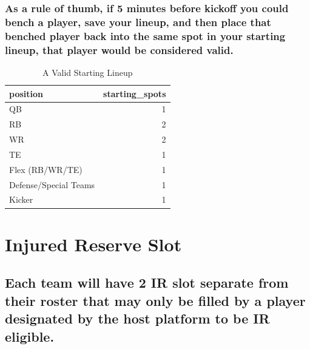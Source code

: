\documentclass[
]{book}
\begin{document}
\hypertarget{as-a-rule-of-thumb-if-5-minutes-before-kickoff-you-could-bench-a-player-save-your-lineup-and-then-place-that-benched-player-back-into-the-same-spot-in-your-starting-lineup-that-player-would-be-considered-valid.}{%
\subsubsection{As a rule of thumb, if 5 minutes before kickoff you could bench a player, save your lineup, and then place that benched player back into the same spot in your starting lineup, that player would be considered valid.}\label{as-a-rule-of-thumb-if-5-minutes-before-kickoff-you-could-bench-a-player-save-your-lineup-and-then-place-that-benched-player-back-into-the-same-spot-in-your-starting-lineup-that-player-would-be-considered-valid.}}

\begin{table}

\caption{\label{tab:unnamed-chunk-9}A Valid Starting Lineup}
\centering
\begin{tabular}[t]{lr}
\toprule
position & starting\_spots\\
\midrule
QB & 1\\
RB & 2\\
WR & 2\\
TE & 1\\
Flex (RB/WR/TE) & 1\\
\addlinespace
Defense/Special Teams & 1\\
Kicker & 1\\
\bottomrule
\end{tabular}
\end{table}

\hypertarget{injured-reserve-slot}{%
\section{Injured Reserve Slot}\label{injured-reserve-slot}}

\hypertarget{each-team-will-have-2-ir-slot-separate-from-their-roster-that-may-only-be-filled-by-a-player-designated-by-the-host-platform-to-be-ir-eligible.}{%
\subsection{Each team will have 2 IR slot separate from their roster that may only be filled by a player designated by the host platform to be IR eligible.}\label{each-team-will-have-2-ir-slot-separate-from-their-roster-that-may-only-be-filled-by-a-player-designated-by-the-host-platform-to-be-ir-eligible.}}
\end{document}
